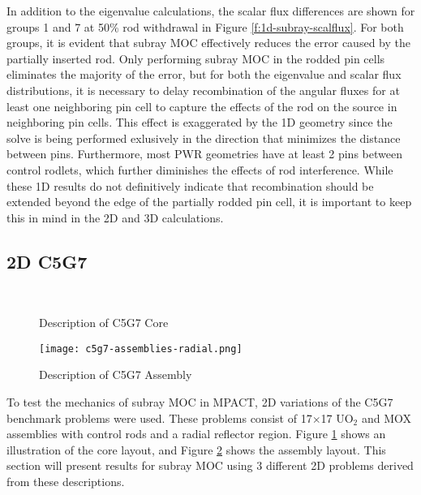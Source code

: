 In addition to the eigenvalue calculations, the scalar flux differences are shown for groups 1 and 7 at 50\% rod withdrawal in Figure \ref{f:1d-subray-scalflux}.  For both groups, it is evident that subray MOC effectively reduces the error caused by the partially inserted rod.  Only performing subray MOC in the rodded pin cells eliminates the majority of the error, but for both the eigenvalue and scalar flux distributions, it is necessary to delay recombination of the angular fluxes for at least one neighboring pin cell to capture the effects of the rod on the source in neighboring pin cells.  This effect is exaggerated by the 1D geometry since the solve is being performed exlusively in the direction that minimizes the distance between pins.  Furthermore, most PWR geometries have at least 2 pins between control rodlets, which further diminishes the effects of rod interference.  While these 1D results do not definitively indicate that recombination should be extended beyond the edge of the partially rodded pin cell, it is important to keep this in mind in the 2D and 3D calculations.

\subsection{2D C5G7}

\begin{figure}[h]
    \centering
    ~
    \caption[Descriptiong of C5G7 Core]{Description of C5G7 Core\cite{EELewisC5G7extended2005}}\label{f:c5g7-core}
\end{figure}

\begin{figure}[h]
    \centering
    \texttt{[image: c5g7-assemblies-radial.png]}
    \caption[Description of C5G7 Assembly]{Description of C5G7 Assembly\cite{EELewisC5G7extended2005}}\label{f:c5g7-assemblies}
\end{figure}

To test the mechanics of subray MOC in MPACT, 2D variations of the C5G7 benchmark problems were used.  These problems consist of 17$\times$17 UO$_2$ and MOX assemblies with control rods and a radial reflector region.  Figure \ref{f:c5g7-core} shows an illustration of the core layout, and Figure \ref{f:c5g7-assemblies} shows the assembly layout.  This section will present results for subray MOC using 3 different 2D problems derived from these descriptions.

